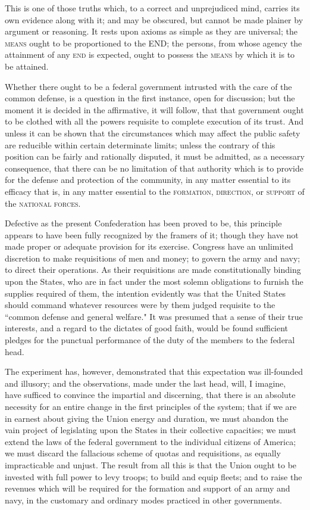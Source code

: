 This is one of those truths which, to a correct and unprejudiced mind, carries its own evidence along with it; and may be obscured, but cannot be made plainer by argument or reasoning. 
It rests upon axioms as simple as they are universal; the \textsc{means} ought to be proportioned to the END; the persons, from whose agency the attainment of any \textsc{end} is expected, ought to possess the \textsc{means} by which it is to be attained.

Whether there ought to be a federal government intrusted with the care of the common defense, is a question in the first instance, open for discussion; but the moment it is decided in the affirmative, it will follow, that that government ought to be clothed with all the powers requisite to complete execution of its trust. 
And unless it can be shown that the circumstances which may affect the public safety are reducible within certain determinate limits; unless the contrary of this position can be fairly and rationally disputed, it must be admitted, as a necessary consequence, that there can be no limitation of that authority which is to provide for the defense and protection of the community, in any matter essential to its efficacy that is, in any matter essential to the \textsc{formation}, \textsc{direction}, or \textsc{support} of the \textsc{national forces}.

Defective as the present Confederation has been proved to be, this principle appears to have been fully recognized by the framers of it; though they have not made proper or adequate provision for its exercise. 
Congress have an unlimited discretion to make requisitions of men and money; to govern the army and navy; to direct their operations. 
As their requisitions are made constitutionally binding upon the States, who are in fact under the most solemn obligations to furnish the supplies required of them, the intention evidently was that the United States should command whatever resources were by them judged requisite to the ``common defense and general welfare." It was presumed that a sense of their true interests, and a regard to the dictates of good faith, would be found sufficient pledges for the punctual performance of the duty of the members to the federal head.

The experiment has, however, demonstrated that this expectation was ill-founded and illusory; and the observations, made under the last head, will, I imagine, have sufficed to convince the impartial and discerning, that there is an absolute necessity for an entire change in the first principles of the system; that if we are in earnest about giving the Union energy and duration, we must abandon the vain project of legislating upon the States in their collective capacities; we must extend the laws of the federal government to the individual citizens of America; we must discard the fallacious scheme of quotas and requisitions, as equally impracticable and unjust. 
The result from all this is that the Union ought to be invested with full power to levy troops; to build and equip fleets; and to raise the revenues which will be required for the formation and support of an army and navy, in the customary and ordinary modes practiced in other governments.

